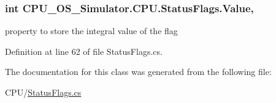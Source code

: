 \subsubsection[{Value}]{\setlength{\rightskip}{0pt plus 5cm}int C\+P\+U\+\_\+\+O\+S\+\_\+\+Simulator.\+C\+P\+U.\+Status\+Flags.\+Value\hspace{0.3cm}{\ttfamily [get]}, {\ttfamily [set]}}\label{class_c_p_u___o_s___simulator_1_1_c_p_u_1_1_status_flags_a2978a3bc6493134bb9546c879e625fc2}


property to store the integral value of the flag 



Definition at line 62 of file Status\+Flags.\+cs.



The documentation for this class was generated from the following file\+:\begin{DoxyCompactItemize}
\item 
C\+P\+U/\hyperlink{_status_flags_8cs}{Status\+Flags.\+cs}\end{DoxyCompactItemize}
